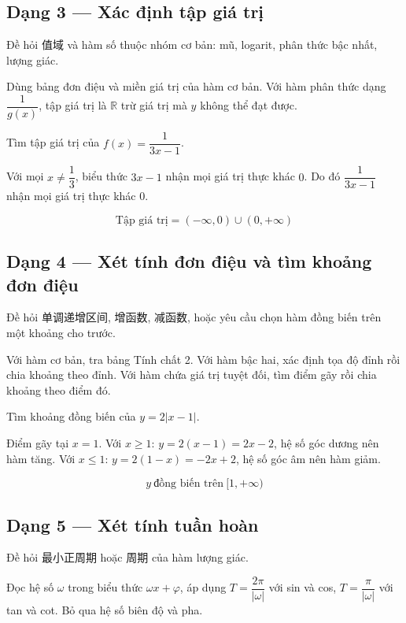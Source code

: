 \documentclass[11pt, a4paper]{article}
\begin{document}
\subsection{Dạng 3 — Xác định tập giá trị}

 Đề hỏi 值域 và hàm số thuộc nhóm cơ bản: mũ, logarit, phân thức bậc nhất, lượng giác.

 Dùng bảng đơn điệu và miền giá trị của hàm cơ bản. Với hàm phân thức dạng $\dfrac{1}{g(x)}$, tập giá trị là $\mathbb{R}$ trừ giá trị mà $y$ không thể đạt được.

\begin{vidu}[{6}]
Tìm tập giá trị của $f(x) = \dfrac{1}{3x - 1}$.

Với mọi $x \neq \dfrac{1}{3}$, biểu thức $3x - 1$ nhận mọi giá trị thực khác $0$. Do đó $\dfrac{1}{3x-1}$ nhận mọi giá trị thực khác $0$.

$$\text{Tập giá trị} = (-\infty, 0) \cup (0, +\infty)$$

\end{vidu}
\subsection{Dạng 4 — Xét tính đơn điệu và tìm khoảng đơn điệu}

 Đề hỏi 单调递增区间, 增函数, 减函数, hoặc yêu cầu chọn hàm đồng biến trên một khoảng cho trước.

 Với hàm cơ bản, tra bảng Tính chất 2. Với hàm bậc hai, xác định tọa độ đỉnh rồi chia khoảng theo đỉnh. Với hàm chứa giá trị tuyệt đối, tìm điểm gãy rồi chia khoảng theo điểm đó.

\begin{vidu}[{7}]
Tìm khoảng đồng biến của $y = 2|x - 1|$.

Điểm gãy tại $x = 1$. Với $x \ge 1$: $y = 2(x-1) = 2x - 2$, hệ số góc dương nên hàm tăng. Với $x \le 1$: $y = 2(1-x) = -2x + 2$, hệ số góc âm nên hàm giảm.

$$y \ \text{đồng biến trên} \ [1, +\infty)$$

\end{vidu}
\subsection{Dạng 5 — Xét tính tuần hoàn}

 Đề hỏi 最小正周期 hoặc 周期 của hàm lượng giác.

 Đọc hệ số $\omega$ trong biểu thức $\omega x + \varphi$, áp dụng $T = \dfrac{2\pi}{|\omega|}$ với sin và cos, $T = \dfrac{\pi}{|\omega|}$ với tan và cot. Bỏ qua hệ số biên độ và pha.
\end{document}

